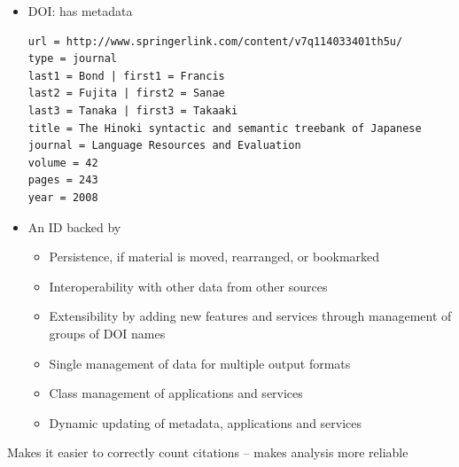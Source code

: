 \documentclass[a4paper,landscape,headrule,footrule,xetex]{foils}
\begin{document}

\begin{itemize}
\item DOI:  has metadata
\begin{verbatim}
url = http://www.springerlink.com/content/v7q114033401th5u/
type = journal 
last1 = Bond | first1 = Francis 
last2 = Fujita | first2 = Sanae 
last3 = Tanaka | first3 = Takaaki 
title = The Hinoki syntactic and semantic treebank of Japanese 
journal = Language Resources and Evaluation 
volume = 42 
pages = 243 
year = 2008 
\end{verbatim}
\end{itemize}


\begin{itemize}
\item An ID backed by 
\begin{itemize}
\item Persistence, if material is moved, rearranged, or bookmarked
\item Interoperability with other data from other sources
\item Extensibility by adding new features and services through management of groups of DOI names
\item Single management of data for multiple output formats
\item Class management of applications and services
\item Dynamic updating of metadata, applications and services
\end{itemize}
\end{itemize}

Makes it easier to correctly count citations -- makes analysis more reliable




\end{document}
